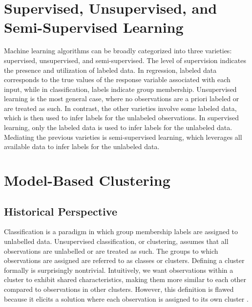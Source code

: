 \documentclass[12pt]{report}
\begin{document}
\section{Supervised, Unsupervised, and Semi-Supervised Learning}
Machine learning algorithms can be broadly categorized into three varieties: supervised, unsupervised, and semi-supervised. The level of supervision indicates the presence and utilization of labeled data. In regression, labeled data corresponds to the true values of the response variable associated with each input, while in classification, labels indicate group membership. Unsupervised learning is the most general case, where no observations are a priori labeled or are treated as such. In contrast, the other varieties involve some labeled data, which is then used to infer labels for the unlabeled observations. In supervised learning, only the labeled data is used to infer labels for the unlabeled data. Mediating the previous varieties is semi-supervised learning, which leverages all available data to infer labels for the unlabeled data. 



\section{Model-Based Clustering}



\subsection{Historical Perspective}
Classification is a paradigm in which group membership labels are assigned to unlabelled data. Unsupervised classification, or clustering, assumes that all observations are unlabelled or are treated as such. The groups to which observations are assigned are referred to as classes or clusters. Defining a cluster formally is surprisingly nontrivial. Intuitively, we want observations within a cluster to exhibit shared characteristics, making them more similar to each other compared to observations in other clusters. 
However, this definition is flawed because it elicits a solution where each observation is assigned to its own cluster \citet{mcnicholas2016a}. 
\end{document}

